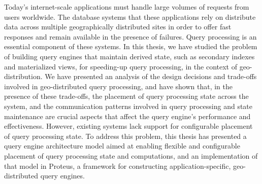 Today's internet-scale applications must handle large volumes of requests from users worldwide.
The database systems that these applications rely on distribute data across multiple geographically distributed sites
in order to offer fast responses and remain available in the presence of failures.
Query processing is an essential component of these systems.
In this thesis, we have studied the problem of building query engines that maintain derived state,
such as secondary indexes and materialized views, for speeding-up query processing, in the context of geo-distribution.
We have presented an analysis of the design decisions and trade-offs involved in geo-distributed query processing,
and have shown that, in the presence of these trade-offs, the placement of query processing state across the system,
and the communication patterns involved in query processing and state maintenance are crucial aspects that affect
the query engine's performance and effectiveness.
However, existing systems lack support for configurable placement of query processing state.
To address this problem, this thesis has presented a query engine architecture model aimed at enabling flexible and
configurable placement of query processing state and computations,
and an implementation of that model in Proteus, a framework for constructing application-specific, geo-distributed
query engines.
